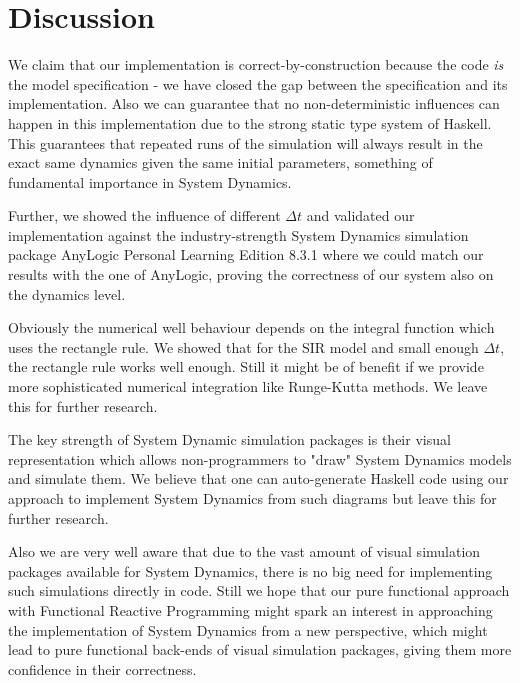 \section{Discussion}
We claim that our implementation is correct-by-construction because the code \textit{is} the model specification - we have closed the gap between the specification and its implementation. Also we can guarantee that no non-deterministic influences can happen in this implementation due to the strong static type system of Haskell. This guarantees that repeated runs of the simulation will always result in the exact same dynamics given the same initial parameters, something of fundamental importance in System Dynamics.


Further, we showed the influence of different $\Delta t$ and validated our implementation against the industry-strength System Dynamics simulation package AnyLogic Personal Learning Edition 8.3.1 where we could match our results with the one of AnyLogic, proving the correctness of our system also on the dynamics level.

Obviously the numerical well behaviour depends on the integral function which uses the rectangle rule. We showed that for the SIR model and small enough $\Delta t$, the rectangle rule works well enough. Still it might be of benefit if we provide more sophisticated numerical integration like Runge-Kutta methods. We leave this for further research.

The key strength of System Dynamic simulation packages is their visual representation which allows non-programmers to "draw" System Dynamics models and simulate them. We believe that one can auto-generate Haskell code using our approach to implement System Dynamics from such diagrams but leave this for further research.

Also we are very well aware that due to the vast amount of visual simulation packages available for System Dynamics, there is no big need for implementing such simulations directly in code. Still we hope that our pure functional approach with Functional Reactive Programming might spark an interest in approaching the implementation of System Dynamics from a new perspective, which might lead to pure functional back-ends of visual simulation packages, giving them more confidence in their correctness.

